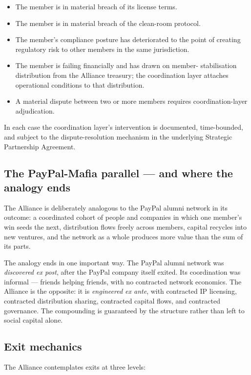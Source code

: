 \begin{itemize}[leftmargin=2em,itemsep=0.1em]
\item The member is in material breach of its license terms.
\item The member is in material breach of the clean-room protocol.
\item The member's compliance posture has deteriorated to the point of
creating regulatory risk to other members in the same jurisdiction.
\item The member is failing financially and has drawn on member-
stabilisation distribution from the Alliance treasury; the coordination
layer attaches operational conditions to that distribution.
\item A material dispute between two or more members requires
coordination-layer adjudication.
\end{itemize}

In each case the coordination layer's intervention is documented,
time-bounded, and subject to the dispute-resolution mechanism in the
underlying Strategic Partnership Agreement.

\subsection{The PayPal-Mafia parallel --- and where the analogy ends}

The Alliance is deliberately analogous to the PayPal alumni network in
its outcome: a coordinated cohort of people and companies in which one
member's win seeds the next, distribution flows freely across members,
capital recycles into new ventures, and the network as a whole produces
more value than the sum of its parts.

The analogy ends in one important way. The PayPal alumni network was
\emph{discovered ex post}, after the PayPal company itself exited. Its
coordination was informal --- friends helping friends, with no contracted
network economics. The Alliance is the opposite: it is \emph{engineered
ex ante}, with contracted IP licensing, contracted distribution sharing,
contracted capital flows, and contracted governance. The compounding is
guaranteed by the structure rather than left to social capital alone.

\subsection{Exit mechanics}

The Alliance contemplates exits at three levels:

